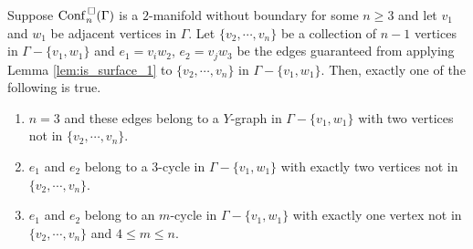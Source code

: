 \begin{lem}
    \label{lem:is_surface_2}
    Suppose \(\mathrm{Conf}^{\,\square}_n(\Gamma)\) is a \(2\)-manifold without boundary for some \(n \ge 3\) and let \(v_1\) and \(w_1\) be adjacent vertices in \(\Gamma\).
    Let \(\{v_2, \cdots, v_n\}\) be a collection of \(n-1\) vertices in \(\Gamma - \{v_1, w_1\}\) 
    and \(e_1 = v_i w_2\), \(e_2 = v_j w_3\) be the edges guaranteed
    from applying Lemma \ref{lem:is_surface_1} to \(\{v_2, \cdots, v_n\}\) in \(\Gamma - \{v_1, w_1\}\).
    Then, exactly one of the following is true.
    \begin{enumerate}
        \item \(n = 3\) and these edges belong to a \(Y\)-graph in \(\Gamma - \{v_1, w_1\}\) with two vertices not in \(\{v_2, \cdots, v_n\}\).
        \item \(e_1\) and \(e_2\) belong to a \(3\)-cycle in \(\Gamma - \{v_1, w_1\}\) with exactly two vertices not in \(\{v_2, \cdots, v_n\}\).
        \item \(e_1\) and \(e_2\) belong to an \(m\)-cycle in \(\Gamma - \{v_1, w_1\}\) with exactly one vertex not in \(\{v_2, \cdots, v_n\}\) and \(4 \le m \le n\).
    \end{enumerate}
\end{lem}

